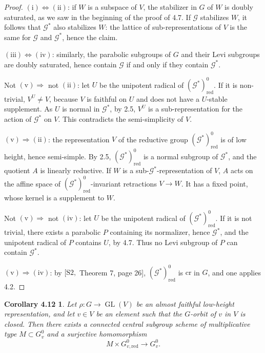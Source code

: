 \documentclass[11pt]{article}
\newcommand{\GL}{\operatorname{GL}}
\newcommand{\red}{\mathrm{red}}
\newtheorem*{corollary412}{Corollary 4.12}
\begin{document}
\begin{proof}
\((\mathrm i)\Leftrightarrow(\mathrm{ii})\): if \(W\) is a subspace of \(V\), the
stabilizer in \(G\) of \(W\) is doubly saturated, as we saw in the beginning of the
proof of 4.7. If \(\mathcal G\) stabilizes \(W\), it follows that \(\mathcal G^*\)
also stabilizes \(W\): the lattice of sub-representations of \(V\) is the same for
\(\mathcal G\) and \(\mathcal G^*\), hence the claim.

\((\mathrm{iii})\Leftrightarrow(\mathrm{iv})\): similarly, the parabolic subgroups of
\(G\) and their Levi subgroups are doubly saturated, hence contain \(\mathcal G\) if and
only if they contain \(\mathcal G^*\).

Not \((\mathrm v)\Rightarrow\) not \((\mathrm{ii})\): let \(U\) be the unipotent
radical of \((\mathcal G^*)^0_{\red}\). If it is non-trivial, \(V^U\ne V\), because
\(V\) is faithful on \(U\) and does not have a \(U\)-stable supplement. As \(U\) is
normal in \(\mathcal G^*\), by 2.5, \(V^U\) is a sub-representation for the action of
\(\mathcal G^*\) on \(V\). This contradicts the semi-simplicity of \(V\).

\((\mathrm v)\Rightarrow(\mathrm{ii})\): the representation \(V\) of the reductive group
\((\mathcal G^*)^0_{\red}\) is of low height, hence semi-simple. By 2.5,
\((\mathcal G^*)^0_{\red}\) is a normal subgroup of \(\mathcal G^*\), and the quotient
\(A\) is linearly reductive. If \(W\) is a sub-\(\mathcal G^*\)-representation of
\(V\), \(A\) acts on the affine space of \((\mathcal G^*)^0_{\red}\)-invariant
retractions \(V\to W\). It has a fixed point, whose kernel is a supplement to \(W\).

Not \((\mathrm v)\Rightarrow\) not \((\mathrm{iv})\): let \(U\) be the unipotent
radical of \((\mathcal G^*)^0_{\red}\). If it is not trivial, there exists a parabolic
\(P\) containing its normalizer, hence \(\mathcal G^*\), and the unipotent radical of
\(P\) contains \(U\), by 4.7. Thus no Levi subgroup of \(P\) can contain
\(\mathcal G^*\).

\((\mathrm v)\Rightarrow(\mathrm{iv})\): by \([\mathrm{S2},\) Theorem 7, page 26],
\((\mathcal G^*)^0_{\red}\) is \(\mathrm{cr}\) in \(G\), and one applies 4.2.
\end{proof}

\begin{corollary412}
Let \(\rho:G\to\GL(V)\) be an almost faithful low-height representation, and let
\(v\in V\) be an element such that the \(G\)-orbit of \(v\) in \(V\) is closed. Then
there exists a connected central subgroup scheme of multiplicative type
\(M\subset G_v^0\) and a surjective homomorphism
\[
  M\times G_{v,\red}^{0}\longrightarrow G_v^0.
\]
\end{corollary412}
\end{document}
